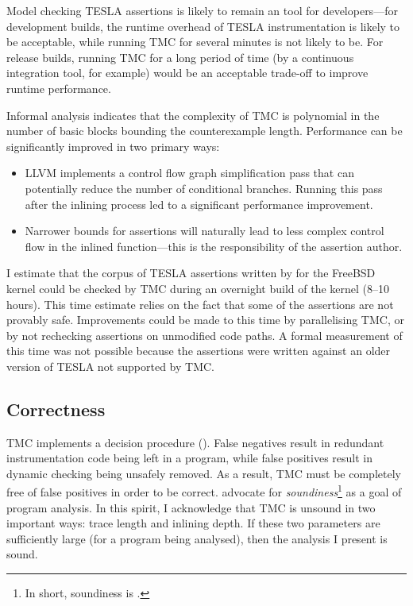 Model checking TESLA assertions is likely to remain an  tool
for developers---for development builds, the runtime overhead of TESLA
instrumentation is likely to be acceptable, while running TMC for several
minutes is not likely to be. For release builds, running TMC for a long period
of time (by a continuous integration tool, for example) would be an acceptable
trade-off to improve runtime performance.

Informal analysis indicates that the complexity of TMC is polynomial in the
number of basic blocks bounding the counterexample length. Performance can be
significantly improved in two primary ways:
\begin{itemize}
  \item LLVM implements a control flow graph simplification pass that can
    potentially reduce the number of conditional branches. Running this pass
    after the inlining process led to a significant performance improvement.
  \item Narrower bounds for assertions will naturally lead to less complex
    control flow in the inlined function---this is the responsibility of the
    assertion author.
\end{itemize}

I estimate that the corpus of TESLA assertions written by
\textcite{anderson_tesla:_2014} for the FreeBSD kernel could be checked
by TMC during an overnight build of the kernel (8--10 hours). This time
estimate relies on the fact that some of the assertions are not provably
safe. Improvements could be made to this time by parallelising TMC, or
by not rechecking assertions on unmodified code paths. A formal
measurement of this time was not possible because the assertions were
written against an older version of TESLA not supported by TMC.

\subsection{Correctness}

TMC implements a decision procedure (). False negatives result in redundant instrumentation code being left
in a program, while false positives result in dynamic checking being unsafely
removed. As a result, TMC must be completely free of false positives in order to
be correct.  \textcite{livshits_defense_2015} advocate for
\emph{soundiness}\footnote{In short, soundiness is .} as a goal of program analysis. In this spirit, I
acknowledge that TMC is unsound in two important ways: trace length and inlining
depth. If these two parameters are sufficiently large (for a program being
analysed), then the analysis I present is sound.

